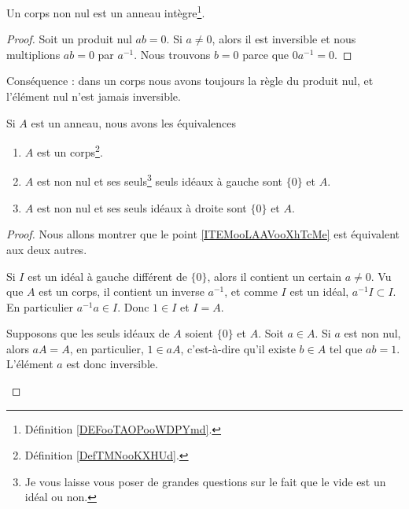 \begin{lemma}       \label{LemAnnCorpsnonInterdivzer}
    Un corps non nul est un anneau intègre\footnote{Définition \ref{DEFooTAOPooWDPYmd}.}.
\end{lemma}

\begin{proof}
    Soit un produit nul \( ab=0\). Si \( a\neq 0\), alors il est inversible et nous multiplions \( ab=0\) par \( a^{-1}\). Nous trouvons \( b=0\) parce que \( 0a^{-1}=0\).
\end{proof}
Conséquence : dans un corps nous avons toujours la règle du produit nul, et l'élément nul n'est jamais inversible.

\begin{proposition}     \label{AnnCorpsIdeal}\label{PROPooUOCVooZGAVVk}
    Si \( A\) est un anneau, nous avons les équivalences
    \begin{enumerate}
        \item       \label{ITEMooLAAVooXhTcMe}
            \( A\) est un corps\footnote{Définition \ref{DefTMNooKXHUd}.}.
        \item       \label{ITEMooDGZIooRopYGx}
            \( A\) est non nul et ses seuls\footnote{Je vous laisse vous poser de grandes questions sur le fait que le vide est un idéal ou non.} seuls idéaux à gauche sont \( \{ 0 \}\) et \( A\).
        \item       \label{ITEMooLPWHooDJpTbR}
            \( A\) est non nul et ses seuls idéaux à droite sont \( \{ 0 \}\) et \( A\).
    \end{enumerate}
\end{proposition}

\begin{proof}
    Nous allons montrer que le point \ref{ITEMooLAAVooXhTcMe} est équivalent aux deux autres.
    \begin{subproof}
        \item[\ref{ITEMooLPWHooDJpTbR} implique \ref{ITEMooDGZIooRopYGx}]
            Si \( I\) est un idéal à gauche différent de \( \{ 0 \}\), alors il contient un certain \( a\neq 0\). Vu que \( A\) est un corps, il contient un inverse \( a^{-1}\), et comme \( I\) est un idéal, \( a^{-1} I\subset I\). En particulier \( a^{-1}a\in I\). Donc \( 1\in I\) et \( I=A\).
        \item[\ref{ITEMooDGZIooRopYGx} implique \ref{ITEMooLAAVooXhTcMe}]

            Supposons que les seuls idéaux de \( A\) soient \( \{ 0 \}\) et \( A\). Soit \( a\in A\). Si \( a\) est non nul, alors \( aA=A\), en particulier, \( 1\in aA\), c'est-à-dire qu'il existe \( b\in A\) tel que \( ab=1\). L'élément \( a\) est donc inversible.
    \end{subproof}
\end{proof}

